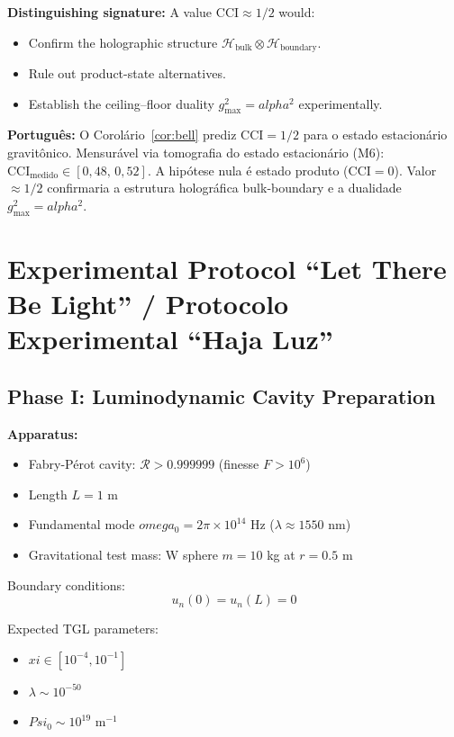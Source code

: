 \documentclass[12pt,a4paper]{article}
\def\Psi{Psi}%
\def\alpha{alpha}%
\def\xi{xi}%
\def\omega{omega}%
\begin{document}
\textbf{Distinguishing signature:} A value $\mathrm{CCI} \approx 1/2$ would:
\begin{itemize}
    \item Confirm the holographic structure $\mathcal{H}_{\mathrm{bulk}} \otimes \mathcal{H}_{\mathrm{boundary}}$.
    \item Rule out product-state alternatives.
    \item Establish the ceiling--floor duality $g_{\max}^2 = \alpha^2$ experimentally.
\end{itemize}

\textbf{Português:} O Corolário~\ref{cor:bell} prediz $\mathrm{CCI} = 1/2$ para o estado estacionário gravitônico. Mensurável via tomografia do estado estacionário (M6): $\mathrm{CCI}_{\text{medido}} \in [0{,}48,\, 0{,}52]$. A hipótese nula é estado produto ($\mathrm{CCI}=0$). Valor $\approx 1/2$ confirmaria a estrutura holográfica bulk-boundary e a dualidade $g_{\max}^2 = \alpha^2$.


\section{Experimental Protocol ``Let There Be Light'' / Protocolo Experimental ``Haja Luz''}

\subsection{Phase I: Luminodynamic Cavity Preparation}

\textbf{Apparatus:}
\begin{itemize}
    \item Fabry-Pérot cavity: $\mathcal{R} > 0.999999$ (finesse $F > 10^6$)
    \item Length $L = 1$ m
    \item Fundamental mode $\omega_0 = 2\pi \times 10^{14}$ Hz ($\lambda \approx 1550$ nm)
    \item Gravitational test mass: W sphere $m = 10$ kg at $r = 0.5$ m
\end{itemize}

Boundary conditions:
\begin{equation}
u_n(0) = u_n(L) = 0
\end{equation}

Expected TGL parameters:
\begin{itemize}
    \item $\xi \in [10^{-4}, 10^{-1}]$
    \item $\lambda \sim 10^{-50}$
    \item $\Psi_0 \sim 10^{19}$ m$^{-1}$
\end{itemize}
\end{document}
